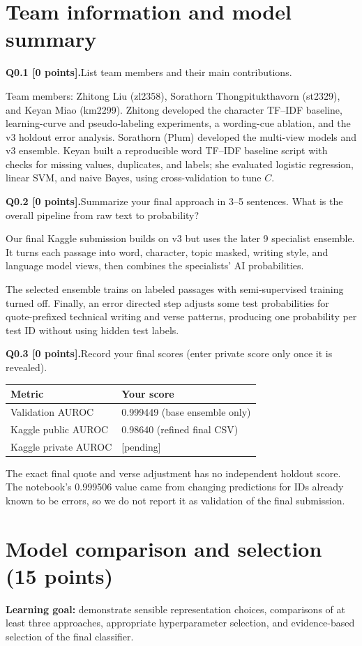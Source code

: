 \documentclass[11pt,letterpaper]{article}
\newcommand{\question}[2]{\needspace{4\baselineskip}\par\addvspace{0.45em}\noindent\textbf{#1}\quad #2\par\nobreak\vspace{0.1em}}
\begin{document}
\section{Team information and model summary}
\question{Q0.1 [0 points].}{List team members and their main contributions.}
Team members: Zhitong Liu (zl2358), Sorathorn Thongpitukthavorn (st2329), and Keyan Miao (km2299). Zhitong developed the character TF--IDF baseline, learning-curve and pseudo-labeling experiments, a wording-cue ablation, and the v3 holdout error analysis. Sorathorn (Plum) developed the multi-view models and v3 ensemble. Keyan built a reproducible word TF--IDF baseline script with checks for missing values, duplicates, and labels; she evaluated logistic regression, linear SVM, and naive Bayes, using cross-validation to tune $C$.
\question{Q0.2 [0 points].}{Summarize your final approach in 3--5 sentences. What is the overall pipeline from raw text to probability?}
Our final Kaggle submission builds on v3 but uses the later 9 specialist ensemble. It turns each passage into word, character, topic masked, writing style, and language model views, then combines the specialists' AI probabilities.

The selected ensemble trains on labeled passages with semi-supervised training turned off. Finally, an error directed step adjusts some test probabilities for quote-prefixed technical writing and verse patterns, producing one probability per test ID without using hidden test labels.
\question{Q0.3 [0 points].}{Record your final scores (enter private score only once it is revealed).}
\begin{tabularx}{\linewidth}{@{}Yp{1.8in}@{}}\toprule Metric & Your score \\ \midrule Validation AUROC & 0.999449 (base ensemble only) \\ Kaggle public AUROC & 0.98640 (refined final CSV) \\ Kaggle private AUROC & [pending] \\ \bottomrule\end{tabularx}

The exact final quote and verse adjustment has no independent holdout score. The notebook's 0.999506 value came from changing predictions for IDs already known to be errors, so we do not report it as validation of the final submission.
\newpage
\section{Model comparison and selection (15 points)}
\textbf{Learning goal:} demonstrate sensible representation choices, comparisons of at least three approaches, appropriate hyperparameter selection, and evidence-based selection of the final classifier.
\end{document}
